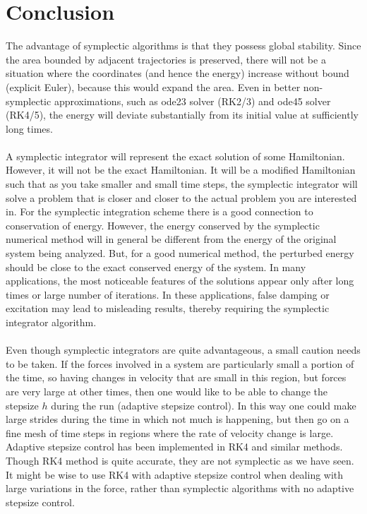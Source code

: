 \documentclass[12pt]{article}
\begin{document}
\section{Conclusion}
The advantage of symplectic algorithms is that they possess global stability. Since the area bounded by adjacent trajectories is preserved, there will not be a situation where the coordinates (and hence the energy) increase without bound (explicit Euler), because this would expand the area. Even in better non-symplectic approximations, such as ode23 solver (RK2/3) and ode45 solver (RK4/5), the energy will deviate substantially from its initial value at suﬃciently long times.\\\\
\indent A symplectic integrator will represent the exact solution of some Hamiltonian. However, it will not be the exact Hamiltonian. It will be a modified Hamiltonian such that as you take smaller and small time steps, the symplectic integrator will solve a problem that is closer and closer to the actual problem you are interested in. For the symplectic integration scheme there is a good connection to conservation of energy. However, the energy conserved by the symplectic numerical method will in general be different from the energy of the original system being analyzed. But, for a good numerical method, the perturbed energy should be close to the exact conserved energy of the system. In many applications, the most noticeable features of the solutions appear only after long times or large number of iterations. In these applications, false damping or excitation may lead to misleading results, thereby requiring the symplectic integrator algorithm. \\\\
\indent Even though symplectic integrators are quite advantageous, a small caution needs to be taken. If the forces involved in a system are particularly small a portion of the time, so having changes in velocity that are small in this region, but forces are very large at other times, then one would like to be able to change the stepsize $h$ during the run (adaptive stepsize control). In this way one could make large strides during the time in which not much is happening, but then go on a fine mesh of time steps in regions where the rate of velocity change is large. Adaptive stepsize control has been implemented in RK4 and similar methods. Though RK4 method is quite accurate, they are not symplectic as we have seen. It might be wise to use RK4 with adaptive stepsize control when dealing with large variations in the force, rather than symplectic algorithms with no adaptive stepsize control.
\end{document}
